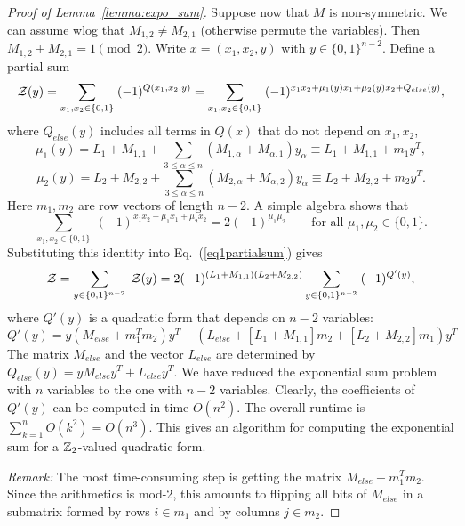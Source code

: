 \begin{proof}[Proof of Lemma~\ref{lemma:expo_sum}]
Suppose now that  $M$ is non-symmetric. 
We can assume wlog that $M_{1,2}\ne M_{2,1}$ (otherwise permute the variables). 
Then $M_{1,2}+M_{2,1}=1 {\pmod 2}$.
Write $x=(x_1,x_2,y)$ with $y\in \{0,1\}^{n-2}$. Define a partial sum 
\begin{equation}
\label{eq1partialsum}
{\cal Z }(y) = \sum_{x_1,x_2\in \{0,1\}}\; (-1)^{Q(x_1,x_2,y)}=
\sum_{x_1,x_2\in \{0,1\}}\; (-1)^{x_1 x_2 + \mu_1(y)  x_1 + \mu_2(y) x_2 + Q_{else}(y)},
\end{equation}
where $Q_{else}(y)$ includes all terms in $Q(x)$ that do not depend on $x_1,x_2$, 
\[
\mu_1(y) = L_1  + M_{1,1} +  \sum_{3\le \alpha \le n} (M_{1, \alpha} + M_{\alpha,1}) y_\alpha
\equiv L_1 + M_{1,1} + m_1  y^T,
\]
\[
\mu_2(y)= L_2 +M_{2,2} +  \sum_{3\le \alpha \le n} (M_{2, \alpha}  + M_{\alpha,2}) y_\alpha 
\equiv L_2 + M_{2,2} +  m_2 y^T. 
\]
Here $m_1,m_2$ are row vectors of length $n-2$. 
A simple algebra shows that 
\begin{equation}
\label{identity}
\sum_{x_1,x_2\in \{0,1\}}\;  (-1)^{x_1 x_2 + \mu_1  x_1 + \mu_2 x_2}= 2(-1)^{\mu_1 \mu_2}
\qquad \mbox{for all $\mu_1,\mu_2\in \{0,1\}$}.
\end{equation}
Substituting this identity into Eq.~(\ref{eq1partialsum}) gives
\begin{equation}
{\cal Z }=\sum_{y\in \{0,1\}^{n-2}}\;  {\cal Z }(y)=2 (-1)^{(L_1+M_{1,1})( L_2 + M_{2,2}) } \sum_{y\in \{0,1\}^{n-2}}\; (-1)^{Q'(y)},
\end{equation}
where $Q'(y)$ is a quadratic form that depends on  $n-2$ variables:
\begin{equation}
\label{eq5}
Q'(y)=y( M_{else} + m_1^T m_2 ) y^T + (L_{else} +  [L_1 + M_{1,1}] m_2 + [L_2 + M_{2,2}] m_1 )y^T
\end{equation}
The matrix $M_{else}$ and the vector $L_{else}$ are determined by
$Q_{else}(y)=yM_{else} y^T + L_{else} y^T$.
We have reduced the exponential sum problem with $n$ variables
to the one with $n-2$ variables. 
Clearly, the coefficients of $Q'(y)$ can be  computed 
in time $O(n^2)$. The overall runtime is $\sum_{k=1}^n O(k^2)=O(n^3)$.
This gives an algorithm for computing the exponential sum for a $\mathbb{Z}_2$-valued
quadratic form. 

{\em Remark:} The most time-consuming step is getting the matrix
$M_{else} + m_1^T m_2$. Since the arithmetics is mod-2, this amounts to flipping all
bits of $M_{else}$ in a submatrix formed by rows $i\in m_1$ and by columns $j\in m_2$.


\end{proof}
